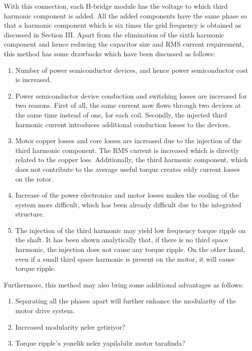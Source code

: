 \documentclass[conference,a4paper,twocolumn]{IEEEtran}
\begin{document}
With this connection, each H-bridge module has the voltage to which third harmonic component is added. All the added components have the same phase so that a harmonic component which is six times the grid frequency is obtained as discussed in Section III. Apart from the elimination of the sixth harmonic component and hence reducing the capacitor size and RMS current requirement, this method has some drawbacks which have been discussed as follows: 
\begin{enumerate}
  \item Number of power semiconductor devices, and hence power semiconductor cost is increased. 
  \item Power semiconductor device conduction and switching losses are increased for two reasons. First of all, the same current now flows through two devices at the same time instead of one, for each coil. Secondly, the injected third harmonic current introduces additional conduction losses to the devices.
  \item Motor copper losses and core losses are increased due to the injection of the third harmonic component. The RMS current is increased which is directly related to the copper loss. Additionally, the third harmonic component, which does not contribute to the average useful torque creates eddy current losses on the rotor.
  \item Increase of the power electronics and motor losses makes the cooling of the system more difficult, which has been already difficult due to the integrated structure.
  \item The injection of the third harmonic may yield low frequency torque ripple on the shaft. It has been shown analytically that, if there is no third space harmonic, the injection does not cause any torque ripple. On the other hand, even if a small third space harmonic is present on the motor, it will cause torque ripple.
\end{enumerate}
Furthermore, this method may also bring some additional advantages as follows:

\begin{enumerate}
  \item Separating all the phases apart will further enhance the modularity of the motor drive system.
  \item Increased modularity neler getiriyor?
  \item Torque ripple'a yonelik neler yapilabilir motor tarafinda?
\end{enumerate}
\end{document}

